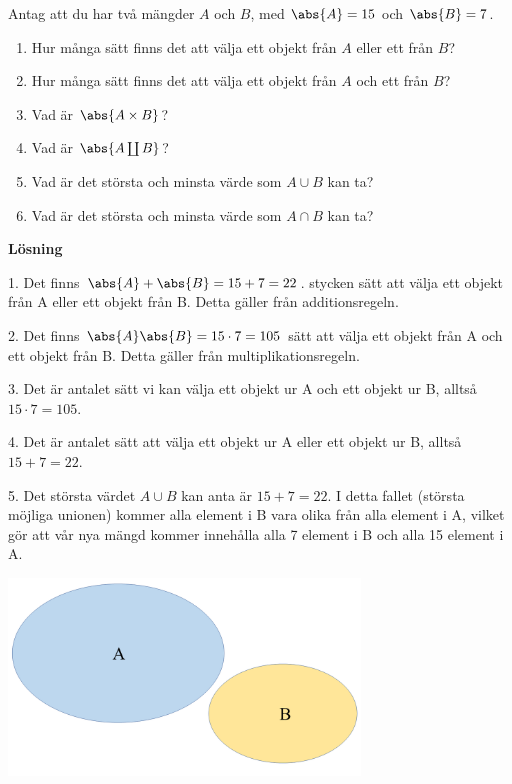 \documentclass{tufte-handout}
\begin{document}
\begin{xca}
	Antag att du har två mängder $A$ och $B$, med $\abs{A} = 15$ och $\abs{B} = 7$.
	\begin{enumerate}
		\item Hur många sätt finns det att välja ett objekt från $A$ eller ett från $B$?
		\item Hur många sätt finns det att välja ett objekt från $A$ och ett från $B$?
		\item Vad är $\abs{A\times B}$?
		\item Vad är $\abs{A \coprod B}$?
		\item Vad är det största och minsta värde som $A \cup B$ kan ta?
		\item Vad är det största och minsta värde som $A \cap B$ kan ta?
	\end{enumerate}

 \noindent\textbf{Lösning}

 \addlinespace 
 
 1. Det finns $\abs{A} + \abs{B} = 15 + 7 = 22$. stycken sätt att välja ett objekt från A eller ett objekt från B. Detta gäller från additionsregeln.
 
\addlinespace

 2. Det finns $\abs{A}\abs{B}  = 15 \cdot 7= 105$ sätt att välja ett objekt från A och ett objekt från B. Detta gäller från multiplikationsregeln. 
 
 \addlinespace

 3. Det är antalet sätt vi kan välja ett objekt ur A och ett objekt ur B, alltså $15 \cdot 7=105$. 

 \addlinespace

 4. Det är antalet sätt att välja ett objekt ur A eller ett objekt ur B, alltså $15 + 7 = 22$.

\addlinespace

 5. Det största värdet $A \cup B$ kan anta är $15+7=22$. I detta fallet (största möjliga unionen) kommer alla element i B vara olika från alla element i A, vilket gör att vår nya mängd kommer innehålla alla 7 element i B och alla 15 element i A. 
 \begin{center}
    \includegraphics[width=0.7\textwidth]{graphics/mangButanformangdA.png}
 \end{center}
 

\end{xca}
\end{document}
